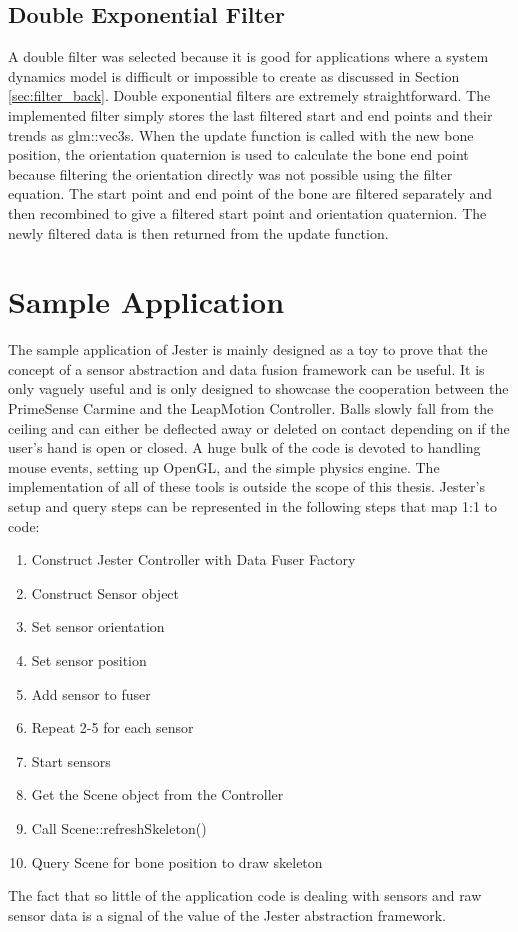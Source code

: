 \subsection{Double Exponential Filter}\label{sec:filter_impl}\label{sec:double_exp}

A double filter was selected because it is good for applications where a system dynamics model is difficult or impossible to create as discussed in Section \ref{sec:filter_back}. Double exponential filters are extremely straightforward. The implemented filter simply stores the last filtered start and end points and their trends as glm::vec3s. When the update function is called with the new bone position, the orientation quaternion is used to calculate the bone end point because filtering the orientation directly was not possible using the filter equation. The start point and end point of the bone are filtered separately and then recombined to give a filtered start point and orientation quaternion. The newly filtered data is then returned from the update function.

\section{Sample Application}\label{sec:app_impl}

The sample application of Jester is mainly designed as a toy to prove that the concept of a sensor abstraction and data fusion framework can be useful. It is only vaguely useful and is only designed to showcase the cooperation between the PrimeSense Carmine and the LeapMotion Controller. Balls slowly fall from the ceiling and can either be deflected away or deleted on contact depending on if the user's hand is open or closed. A huge bulk of the code is devoted to handling mouse events, setting up OpenGL, and the simple physics engine. The implementation of all of these tools is outside the scope of this thesis. Jester's setup and query steps can be represented in the following steps that map 1:1 to code:

\begin{enumerate}
  \item Construct Jester Controller with Data Fuser Factory
  \item Construct Sensor object
  \item Set sensor orientation
  \item Set sensor position
  \item Add sensor to fuser
  \item Repeat 2-5 for each sensor
  \item Start sensors
  \item Get the Scene object from the Controller
  \item Call Scene::refreshSkeleton()
  \item Query Scene for bone position to draw skeleton
\end{enumerate}

The fact that so little of the application code is dealing with sensors and raw sensor data is a signal of the value of the Jester abstraction framework.
